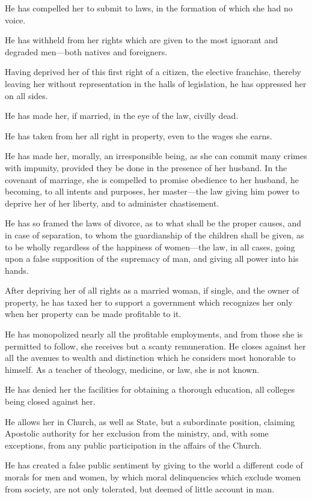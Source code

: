 He has compelled her to submit to laws, in the formation of which she
had no voice.

He has withheld from her rights which are given to the most ignorant
and degraded men---both natives and foreigners.

Having deprived her of this first right of a citizen, the elective
franchise, thereby leaving her without representation in the halls of
legislation, he has oppressed her on all sides.

He has made her, if married, in the eye of the law, civilly dead.

He has taken from her all right in property, even to the wages she
earns.

He has made her, morally, an irresponsible being, as she can commit
many crimes with impunity, provided they be done in the presence of
her husband. In the covenant of marriage, she is compelled to promise
obedience to her husband, he becoming, to all intents and purposes,
her master---the law giving him power to deprive her of her liberty,
and to administer chastisement.

He has so framed the laws of divorce, as to what shall be the
proper causes, and in case of separation, to whom the guardianship of
the children shall be given, as to be wholly regardless of the
happiness of women---the law, in all cases, going upon a false
supposition of the supremacy of man, and giving all power into his
hands.

After depriving her of all rights as a married woman, if single, and
the owner of property, he has taxed her to support a government which
recognizes her only when her property can be made profitable to it.

He has monopolized nearly all the profitable employments, and from
those she is permitted to follow, she receives but a scanty
remuneration. He closes against her all the avenues to wealth and
distinction which he considers most honorable to himself. As a teacher
of theology, medicine, or law, she is not known.

He has denied her the facilities for obtaining a thorough education,
all colleges being closed against her.

He allows her in Church, as well as State, but a subordinate position,
claiming Apostolic authority for her exclusion from the ministry, and,
with some exceptions, from any public participation in the affairs
of the Church.

He has created a false public sentiment by giving to the world a
different code of morals for men and women, by which moral
delinquencies which exclude women from society, are not only
tolerated, but deemed of little account in man.

